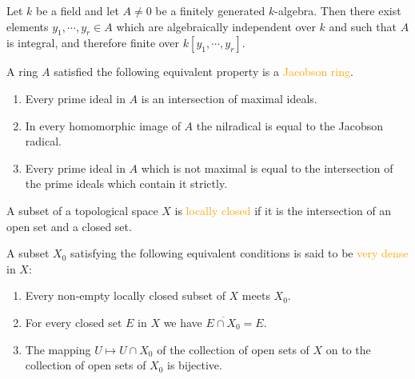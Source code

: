 \begin{proposition*}[\textcolor{red}{Noether normalization lemma}]\label{noethernormalization}
	Let $k$ be a field and let $A\neq0$ be a finitely generated $k$-algebra. Then there exist elements $y_1,\cdots,y_r\in A$ which are algebraically independent over $k$ and such that $A$ is integral, and therefore finite over $k[y_1,\cdots,y_r]$.
\end{proposition*}

\begin{definition}
	A ring $A$ satisfied the following equivalent property is a \textcolor{orange}{Jacobson ring}.
	\begin{enumerate}[label=\textup{(\roman*)}]
		\item Every prime ideal in $A$ is an intersection of maximal ideals.
		\item In every homomorphic image of $A$ the nilradical is equal to the Jacobson radical.
		\item Every prime ideal in $A$ which is not maximal is equal to the intersection of the prime ideals which contain it strictly.
	\end{enumerate}
\end{definition}

\begin{definition}
	A subset of a topological space $X$ is \textcolor{orange}{locally closed} if it is the intersection of an open set and a closed set.
	
	A subset $X_0$ satisfying the following equivalent conditions is said to be \textcolor{orange}{very dense} in $X$:
	\begin{enumerate}[label=\textup{(\arabic*)}]
		\item Every non-empty locally closed subset of $X$ meets $X_0$.
		\item For every closed set $E$ in $X$ we have $\overline{E\cap X_0}=E$.
		\item The mapping $U\mapsto U\cap X_0$ of the collection of open sets of $X$ on to the collection of open sets of $X_0$ is bijective.
	\end{enumerate}
\end{definition}

